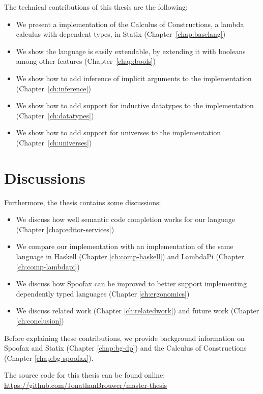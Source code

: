 The technical contributions of this thesis are the following:
\begin{itemize}
	\item We present a implementation of the Calculus of Constructions, a lambda calculus with dependent types, in Statix (Chapter~\ref{chap:baselang})
	\item We show the language is easily extendable, by extending it with booleans among other features (Chapter~\ref{chap:bools})
	\item We show how to add inference of implicit arguments to the implementation (Chapter~\ref{ch:inference})
	\item We show how to add support for inductive datatypes to the implementation (Chapter~\ref{ch:datatypes})
	\item We show how to add support for universes to the implementation (Chapter~\ref{ch:universes})
\end{itemize}

\section*{Discussions}

Furthermore, the thesis contains some discussions:
\begin{itemize}
	\item We discuss how well semantic code completion works for our language (Chapter \ref{chap:editor-services})
	\item We compare our implementation with an implementation of the same language in Haskell (Chapter \ref{ch:comp-haskell}) and LambdaPi (Chapter \ref{ch:comp-lambdapi})
	\item We discuss how Spoofax can be improved to better support implementing dependently typed languages (Chapter \ref{ch:ergonomics})
	\item We discuss related work (Chapter \ref{ch:relatedwork}) and future work (Chapter \ref{ch:conclusion})
\end{itemize}

\noindent Before explaining these contributions, we provide background information on Spoofax and Statix (Chapter \ref{chap:bg-dp}) and the Calculus of Constructions (Chapter \ref{chap:bg-spoofax}).

The source code for this thesis can be found online: \url{https://github.com/JonathanBrouwer/master-thesis}

